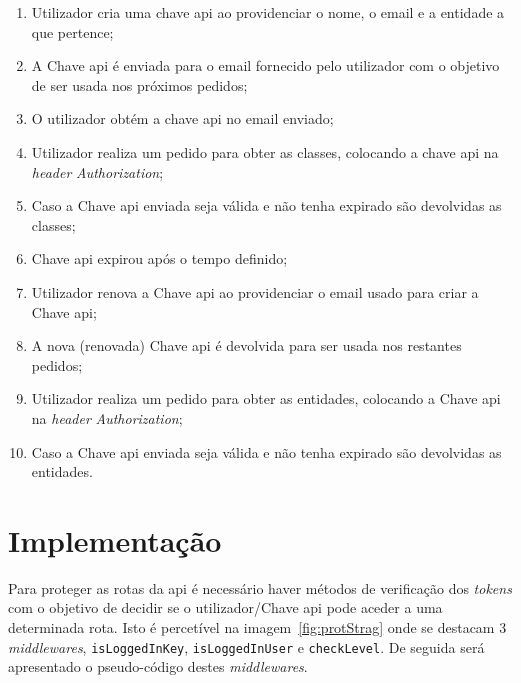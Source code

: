 \begin{enumerate}
    \item Utilizador cria uma chave \acrshort{api} ao providenciar o nome, o email e a entidade a que pertence;
    \item A Chave \acrshort{api} é enviada para o email fornecido pelo utilizador com o objetivo de ser usada nos 
    próximos pedidos;
    \item O utilizador obtém a chave \acrshort{api} no email enviado;
    \item Utilizador realiza um pedido para obter as classes, colocando a chave \acrshort{api} na 
    \textit{header} \textit{Authorization};
    \item Caso a Chave \acrshort{api} enviada seja válida e não tenha expirado são devolvidas as classes;
    \item Chave \acrshort{api} expirou após o tempo definido;
    \item Utilizador renova a Chave \acrshort{api} ao providenciar o email usado para criar a Chave \acrshort{api};
    \item A nova (renovada) Chave \acrshort{api} é devolvida para ser usada nos restantes pedidos;
    \item Utilizador realiza um pedido para obter as entidades, colocando a Chave \acrshort{api} na 
    \textit{header} \textit{Authorization};
    \item Caso a Chave \acrshort{api} enviada seja válida e não tenha expirado são devolvidas as entidades.
\end{enumerate}

\section{Implementação}

Para proteger as rotas da \acrshort{api} é necessário haver métodos de verificação dos \textit{tokens} com o objetivo de decidir se o utilizador/Chave \acrshort{api} pode aceder a uma determinada rota. Isto é percetível na imagem~\ref{fig:protStrag} onde se destacam 3 \textit{middlewares}, \texttt{isLoggedInKey}, \texttt{isLoggedInUser} e \texttt{checkLevel}. De seguida será apresentado o pseudo-código destes \textit{middlewares}. 

